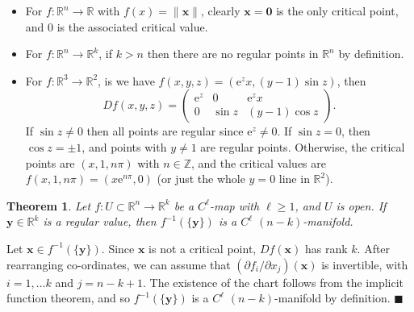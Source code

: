 \documentclass[letter-paper]{tufte-book}
\newtheorem{theorem}{\color{pastel-blue}Theorem}[section]
\newenvironment{proof}[1][Proof]{\begin{trivlist}
\item[\hskip \labelsep {\bfseries #1}]}{\end{trivlist}}
\newenvironment{example}[1][Example]{\begin{trivlist}
\item[\hskip \labelsep {\bfseries #1}]}{\end{trivlist}}
\newcommand{\ex}{\mathrm{e}}
\newcommand{\qed}{\hfill$\blacksquare$}
\begin{document}
\begin{example}
  \begin{itemize}
    \item For $f: \mathbb{R}^n \to \mathbb{R}$ with $f(x) = \|\boldsymbol{x}\|$,
    clearly $\boldsymbol{x} = \boldsymbol{0}$ is the only critical point, and 0
    is the associated critical value.
    
    \item For $f:\mathbb{R}^n \to \mathbb{R}^k$, if $k > n$ then there are no
    regular points in $\mathbb{R}^n$ by definition.
    
    \item For $f:\mathbb{R}^3 \to \mathbb{R}^2$, is we have $f(x,y,z) = (\ex^z
    x, (y-1) \sin z)$, then
    \begin{equation*}
      Df(x,y,z) = \begin{pmatrix}
         \ex^z & 0 & \ex^z x\\
         0 & \sin z & (y-1)\cos z
      \end{pmatrix}.
    \end{equation*}
    If $\sin z \neq 0$ then all points are regular since $\ex^z \neq 0$. If
    $\sin z = 0$, then $\cos z = \pm 1$, and points with $y\neq 1$ are regular
    points. Otherwise, the critical points are $(x, 1, n\pi)$ with
    $n\in\mathbb{Z}$, and the critical values are $f(x, 1, n\pi) = (x\ex^{n\pi},
    0)$ (or just the whole $y=0$ line in $\mathbb{R}^2$).
  \end{itemize}
\end{example}

\begin{theorem}
  Let $f : U \subset \mathbb{R}^n \to \mathbb{R}^k$ be a $C^\ell$-map with $\ell
  \geq 1$, and $U$ is open. If $\boldsymbol{y} \in \mathbb{R}^k$ is a regular
  value, then $f^{-1}(\{\boldsymbol{y}\})$ is a $C^\ell$ $(n-k)$-manifold.
\end{theorem}

\begin{proof}
  Let $\boldsymbol{x} \in f^{-1}(\{\boldsymbol{y}\})$. Since $\boldsymbol{x}$ is
  not a critical point, $Df(\boldsymbol{x})$ has rank $k$. After rearranging
  co-ordinates, we can assume that $(\partial f_i / \partial
  x_j)(\boldsymbol{x})$ is invertible, with $i = 1,\ldots k$ and $j = n-k+1$.
  The existence of the chart follows from the implicit function theorem, and so
  $f^{-1}(\{\boldsymbol{y}\})$ is a $C^\ell$ $(n-k)$-manifold by definition. \qed
\end{proof}
\end{document}
